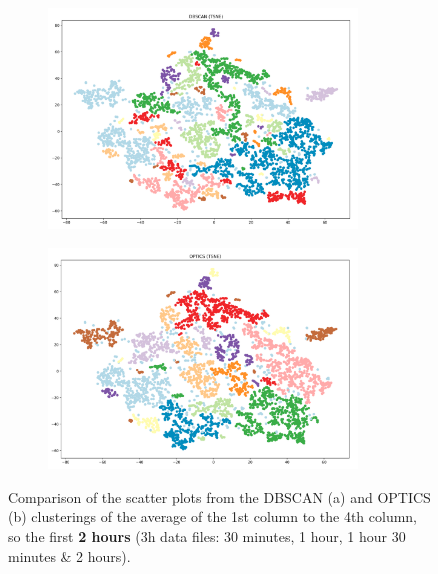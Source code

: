\begin{figure}[H]
	\centering
	\begin{subfigure}{.5\textwidth}
    \centering
    \includegraphics[width=0.9\textwidth]{./images/clusteringResults/3h-4-DBSCAN.png}
  \end{subfigure}%
  \begin{subfigure}{.5\textwidth}
    \centering
    \includegraphics[width=0.9\textwidth]{./images/clusteringResults/3h-4-OPTICS.png}
	\end{subfigure}
	\caption{Comparison of the scatter plots from the DBSCAN (a) and OPTICS (b) clusterings of the average of the 1st column to the 4th column, so the first \textbf{2 hours} (3h data files: 30 minutes, 1 hour, 1 hour 30 minutes \& 2 hours).}
  \label{figure:finalClustering3h-4}
\end{figure}


